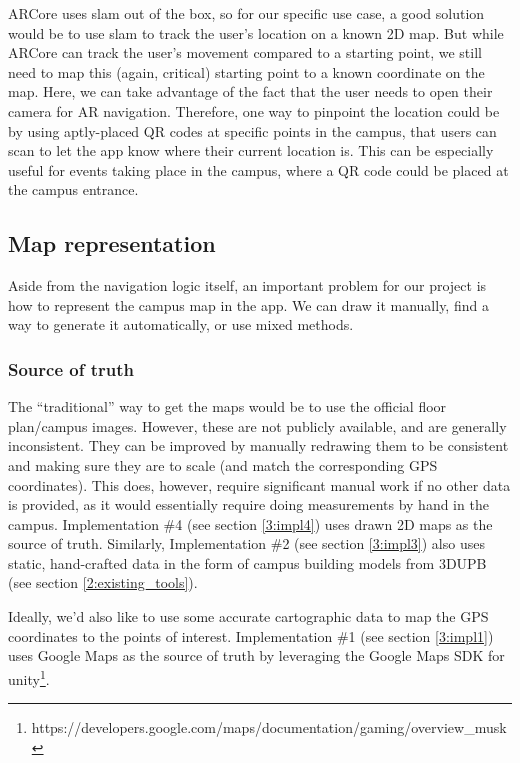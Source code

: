         ARCore uses \acrshort{slam} out of the box, so for our specific use case, a good solution would be to use \acrshort{slam} to track the user’s location on a known 2D map. But while ARCore can track the user’s movement compared to a starting point, we still need to map this (again, critical) starting point to a known coordinate on the map. Here, we can take advantage of the fact that the user needs to open their camera for AR navigation. Therefore, one way to pinpoint the location could be by using aptly-placed QR codes at specific points in the campus, that users can scan to let the app know where their current location is. This can be especially useful for events taking place in the campus, where a QR code could be placed at the campus entrance.

    \subsection{Map representation}
    
        Aside from the navigation logic itself, an important problem for our project is how to represent the campus map in the app. We can draw it manually, find a way to generate it automatically, or use mixed methods.

        \subsubsection{Source of truth}
        
            The “traditional” way to get the maps would be to use the official floor plan/campus images. However, these are not publicly available, and are generally inconsistent. They can be improved by manually redrawing them to be consistent and making sure they are to scale (and match the corresponding GPS coordinates). This does, however, require significant manual work if no other data is provided, as it would essentially require doing measurements by hand in the campus. Implementation \#4 (see section \ref{3:impl4}) uses drawn 2D maps as the source of truth. Similarly, Implementation \#2 (see section \ref{3:impl3}) also uses static, hand-crafted data in the form of campus building models from 3DUPB (see section \ref{2:existing_tools}). 
            
            Ideally, we’d also like to use some accurate cartographic data to map the GPS coordinates to the points of interest. Implementation \#1 (see section \ref{3:impl1}) uses Google Maps as the source of truth by leveraging the Google Maps SDK for \gls{unity}\footnote{https://developers.google.com/maps/documentation/gaming/overview\_musk}.
            
